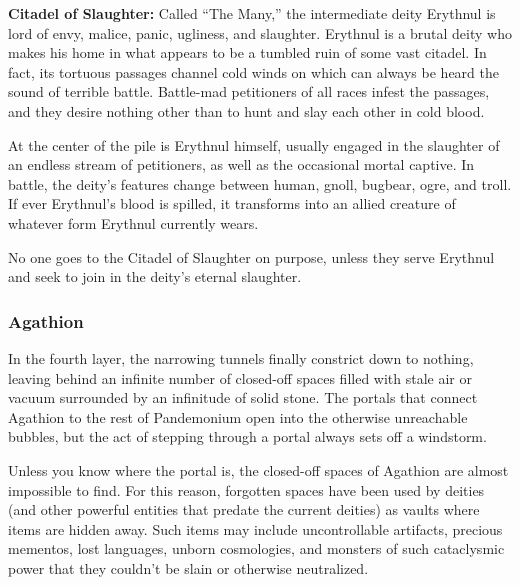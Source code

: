 \textbf{Citadel of Slaughter:} Called ``The Many,'' the intermediate deity Erythnul is lord of envy, malice, panic, ugliness, and slaughter. Erythnul is a brutal deity who makes his home in what appears to be a tumbled ruin of some vast citadel. In fact, its tortuous passages channel cold winds on which can always be heard the sound of terrible battle. Battle-mad petitioners of all races infest the passages, and they desire nothing other than to hunt and slay each other in cold blood.

At the center of the pile is Erythnul himself, usually engaged in the slaughter of an endless stream of petitioners, as well as the occasional mortal captive. In battle, the deity's features change between human, gnoll, bugbear, ogre, and troll. If ever Erythnul's blood is spilled, it transforms into an allied creature of whatever form Erythnul currently wears.

No one goes to the Citadel of Slaughter on purpose, unless they serve Erythnul and seek to join in the deity's eternal slaughter.

\subsubsection{Agathion}
In the fourth layer, the narrowing tunnels finally constrict down to nothing, leaving behind an infinite number of closed-off spaces filled with stale air or vacuum surrounded by an infinitude of solid stone. The portals that connect Agathion to the rest of Pandemonium open into the otherwise unreachable bubbles, but the act of stepping through a portal always sets off a windstorm.

Unless you know where the portal is, the closed-off spaces of Agathion are almost impossible to find. For this reason, forgotten spaces have been used by deities (and other powerful entities that predate the current deities) as vaults where items are hidden away. Such items may include uncontrollable artifacts, precious mementos, lost languages, unborn cosmologies, and monsters of such cataclysmic power that they couldn't be slain or otherwise neutralized.
